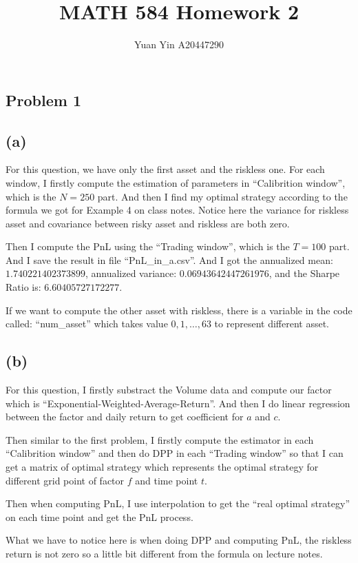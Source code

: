 \documentclass[letterpaper,11pt]{article}
\author{Yuan Yin A20447290}
\title{MATH 584 Homework 2}
\begin{document}
\large
\maketitle
\begin{spacing}{1.2}  %
\section*{Problem 1}
\subsection*{(a)}
For this question, we have only the first asset and the riskless one. For each window, I firstly compute the estimation of parameters in ``Calibrition window'', which is the $N=250$ part. And then I find my optimal strategy according to the formula we got for Example 4 on class notes. Notice here the variance for riskless asset and covariance between risky asset and riskless are both zero.

Then I compute the PnL using the ``Trading window'', which is the $T=100$ part. And I save the result in file ``PnL\_in\_a.csv''. And I got the annualized mean: $1.740221402373899$, annualized variance: $0.06943642447261976$, and the Sharpe Ratio is: $6.60405727172277$.

If we want to compute the other asset with riskless, there is a variable in the code called: ``num\_asset'' which takes value $0,1,\ldots,63$ to represent different asset.

\subsection*{(b)}
For this question, I firstly substract the Volume data and compute our factor which is ``Exponential-Weighted-Average-Return''. And then I do linear regression between the factor and daily return to get coefficient for $a$ and $c$.

Then similar to the first problem, I firstly compute the estimator in each ``Calibrition window'' and then do DPP in each ``Trading window'' so that I can get a matrix of optimal strategy which represents the optimal strategy for different grid point of factor $f$ and time point $t$.

Then when computing PnL, I use interpolation to get the ``real optimal strategy'' on each time point and get the PnL process.

What we have to notice here is when doing DPP and computing PnL, the riskless return is not zero so a little bit different from the formula on lecture notes.


\end{spacing}
\end{document}
